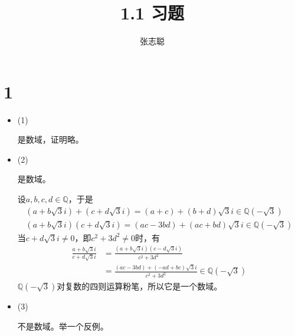 \documentclass{article}
\begin{document}
\title{1.1 习题}
\author{张志聪}
\maketitle

\section*{1}

\begin{itemize}
    \item (1)

          是数域，证明略。
    \item (2)

          是数域。

          设$a, b, c, d \in \mathbb{Q}$，于是
          \begin{align*}
              (a + b\sqrt{3}i) + (c + d\sqrt{3}i) = (a + c) + (b + d)\sqrt{3}i \in \mathbb{Q}(-\sqrt{3}) \\
              (a + b\sqrt{3}i) (c + d\sqrt{3}i) = (ac - 3bd) + (ac + bd)\sqrt{3}i \in \mathbb{Q}(-\sqrt{3})
          \end{align*}
          当$c + d\sqrt{3}i \neq 0$，即$c^2 + 3d^2 \neq 0$时，有
          \begin{align*}
              \frac{a + b\sqrt{3}i}{c + d\sqrt{3}i}
               & = \frac{(a + b\sqrt{3}i)(c - d\sqrt{3}i)}{c^2 + 3d^2}                           \\
               & = \frac{(ac - 3bd) + (-ad + bc)\sqrt{3}i}{c^2 + 3d^2} \in \mathbb{Q}(-\sqrt{3})
          \end{align*}
          $\mathbb{Q}(-\sqrt{3})$对复数的四则运算粉笔，所以它是一个数域。

    \item (3)

          不是数域。举一个反例。

          


\end{itemize}
\end{document}
